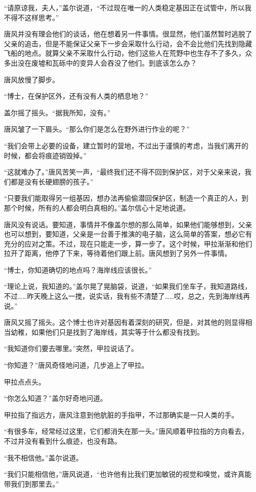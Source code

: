 “请原谅我，夫人，”盖尔说道，“不过现在唯一的人类稳定基因正在试管中，所以我不得不这样思考。”

唐风并没有理会他们的谈话，他在想着另一件事情。很显然，他们虽然暂时逃脱了父亲的追击，但是不能保证父亲下一步会采取什么行动，会不会比他们先找到隐藏飞船的地点。就算父亲不采取什么行动，他们这些人在荒野中也生存不了多久，众多出没在废墟和瓦砾中的变异人会吞没了他们。到底该怎么办？

唐风放慢了脚步。

“博士，在保护区外，还有没有人类的栖息地？”

盖尔摇了摇头。“据我所知，没有。”

唐风皱了一下眉头。“那么你们是怎么在野外进行作业的呢？”

“我们会带上必要的设备，建立暂时的营地，不过出于谨慎的考虑，当我们离开的时候，都会将痕迹销毁掉。”

“这就难办了。”唐风苦笑一声，“最终我们还不得不回到保护区，对于父亲来说，我们都是没有长硬翅膀的孩子。”

“只要我们能取得另一组基因，想办法再偷偷潜回保护区，制造一个真正的人，到那个时候，所有的人都会明白真相的。”盖尔信心十足地说道。

唐风没有说话。要知道，事情并不像盖尔想的那么简单，如果他们能够想到，父亲也可以想到，要知道，父亲是一台善于推演的电子脑，这么简单的答案，想必它有充分的应对之策。不过，现在只能走一步，算一步了。这个时候，甲拉渐渐和他们拉开了距离，他停了下来，等待着他们跟上前。唐风想到了另外一件事情。

“博士，你知道确切的地点吗？海岸线应该很长。”

“理论上说，我知道的。”盖尔晃了晃脑袋，说道，“如果我们坐车子，我知道路线，不过……昨天晚上这么一搅，说实话，我有些不清楚了……哎，总之，先到海岸线再说。”

唐风又摇了摇头。这个博士也许对基因有着深刻的研究，但是，对其他的则显得相当幼稚，如果他们只是找到了海岸线，其实等于什么都没有找到。

“我知道你们要去哪里。”突然，甲拉说话了。

“你知道？”唐风奇怪地问道，几步追上了甲拉。

甲拉点点头。

“你怎么知道？”盖尔好奇地问道。

甲拉指了指远方，唐风注意到他肮脏的手指甲，不过那确实是一只人类的手。

“有很多车，经常经过这里，它们都消失在那一头。”唐风顺着甲拉指的方向看去，不过并没有看到什么痕迹，也没有路。

“我不相信他。”盖尔说道。

“我们只能相信他，”唐风说道，“也许他有比我们更加敏锐的视觉和嗅觉，或许真能带我们到那里去。”

